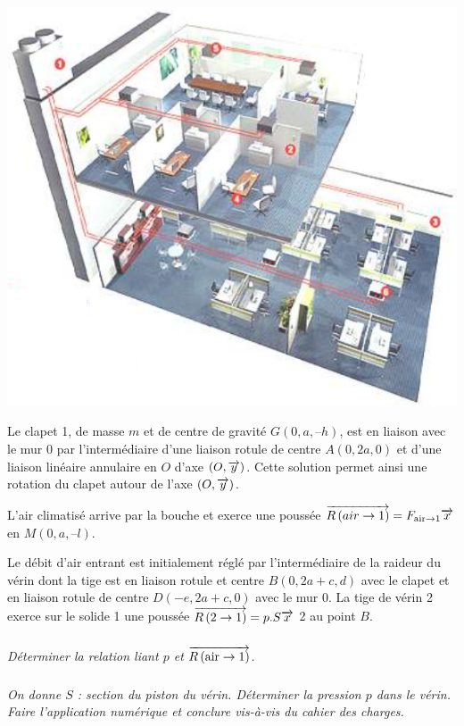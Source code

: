 \documentclass[10pt,fleqn]{article} %
\begin{document}
\begin{multicols}{2}
\begin{center}
\includegraphics[width=.95\linewidth]{images/img1}
\end{center}




Le clapet 1, de masse $m$ et de centre de gravité $G (0,a,–h)$, est en liaison avec le mur 0 par l’intermédiaire d’une liaison rotule de centre $A (0,2a,0)$ et d’une liaison linéaire annulaire en $O$ d’axe $(O, \overrightarrow{y})$. Cette solution permet ainsi une rotation du clapet autour de l’axe $(O, \overrightarrow{y})$.

L’air climatisé arrive par la bouche et exerce une poussée $\overrightarrow{R\left( {air} \rightarrow {1}\right)} = F_{\text{air}\rightarrow 1}\overrightarrow{x}$ en $M (0,a,–l)$.  

Le débit d’air entrant est initialement réglé par l’intermédiaire de la raideur du vérin dont la tige est en liaison rotule et centre $B (0,2a+c,d)$  avec le clapet et en liaison rotule de centre $D (-e,2a+c,0)$  avec le mur 0. La tige de vérin 2 exerce sur le solide 1 une poussée $\overrightarrow{R\left( {2} \rightarrow {1}\right)} = p.S \overrightarrow{x}$ 2 au point $B$.
%
% 
%
% 
  \subparagraph{}
 \textit{Déterminer la relation liant $p$ et 
 $\overrightarrow{R\left( {\text{air}} \rightarrow {1}\right)}$.}
 
\subparagraph{}
\textit{On donne $S$ : section du piston du vérin. Déterminer la pression $p$ dans le vérin. Faire l’application numérique et conclure vis-à-vis du cahier des charges.}



\ifprof
\else
\end{multicols}
\fi
\end{document}
